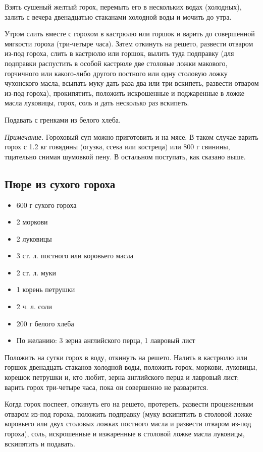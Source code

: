 Взять сушеный желтый горох, перемыть его в нескольких водах (холодных), залить с вечера двенадцатью стаканами холодной воды и мочить до утра.

Утром слить вместе с горохом в кастрюлю или горшок и варить до совершенной мягкости гороха (три-четыре часа). Затем откинуть на решето, развести отваром из-под гороха, слить в кастрюлю или горшок, вылить туда подправку (для подправки распустить в особой кастрюле две столовые ложки макового, горчичного или какого-либо другого постного или одну столовую ложку чухонского масла, всыпать муку дать раза два или три вскипеть, развести отваром из-под гороха), прокипятить, положить искрошенные и поджаренные в ложке масла луковицы, горох, соль и дать несколько раз вскипеть.

Подавать с гренками из белого хлеба.

\emph{Примечание.} Гороховый суп можно приготовить и на мясе. В таком случае варить горох с 1.2 кг говядины (огузка, ссека или костреца) или 800 г свинины, тщательно снимая шумовкой пену. В остальном поступать, как сказано выше.

\subsection{Пюре из сухого гороха}\label{4pure-goroh}

\begin{itemize}
	\item 600 г сухого гороха 
    \item 2 моркови 
    \item 2 луковицы
    \item 3 ст. л. постного или коровьего масла
    \item 2 ст. л. муки
    \item 1 корень петрушки
    \item 2 ч. л. соли
    \item 200 г белого хлеба
    \item По желанию: 3 зерна английского перца, 1 лавровый лист
\end{itemize}

Положить на сутки горох в воду, откинуть на решето. Налить в кастрюлю или горшок двенадцать стаканов холодной воды, положить горох, моркови, луковицы, корешок петрушки и, кто любит, зерна английского перца и лавровый лист; варить горох три-четыре часа, пока он совершенно не разварится.

Когда горох поспеет, откинуть его на решето, протереть, развести процеженным отваром из-под гороха, положить подправку (муку вскипятить в столовой ложке коровьего или двух столовых ложках постного масла и развести отваром из-под гороха), соль, искрошенные и изжаренные в столовой ложке масла луковицы, вскипятить и подавать.

